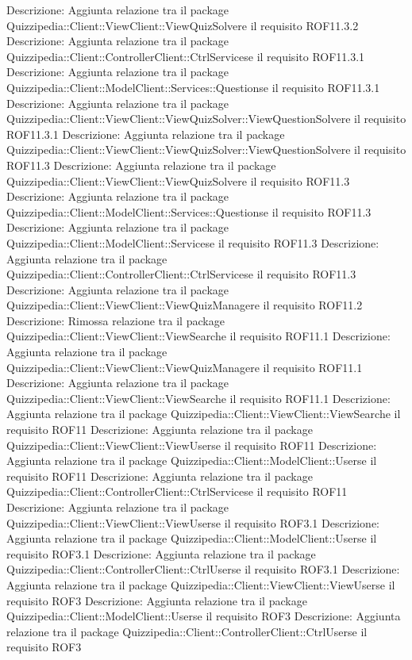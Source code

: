 Descrizione: Aggiunta relazione tra il package Quizzipedia::Client::ViewClient::ViewQuizSolvere il requisito ROF11.3.2 
Descrizione: Aggiunta relazione tra il package Quizzipedia::Client::ControllerClient::CtrlServicese il requisito ROF11.3.1 
Descrizione: Aggiunta relazione tra il package Quizzipedia::Client::ModelClient::Services::Questionse il requisito ROF11.3.1 
Descrizione: Aggiunta relazione tra il package Quizzipedia::Client::ViewClient::ViewQuizSolver::ViewQuestionSolvere il requisito ROF11.3.1 
Descrizione: Aggiunta relazione tra il package Quizzipedia::Client::ViewClient::ViewQuizSolver::ViewQuestionSolvere il requisito ROF11.3 
Descrizione: Aggiunta relazione tra il package Quizzipedia::Client::ViewClient::ViewQuizSolvere il requisito ROF11.3 
Descrizione: Aggiunta relazione tra il package Quizzipedia::Client::ModelClient::Services::Questionse il requisito ROF11.3 
Descrizione: Aggiunta relazione tra il package Quizzipedia::Client::ModelClient::Servicese il requisito ROF11.3 
Descrizione: Aggiunta relazione tra il package Quizzipedia::Client::ControllerClient::CtrlServicese il requisito ROF11.3 
Descrizione: Aggiunta relazione tra il package Quizzipedia::Client::ViewClient::ViewQuizManagere il requisito ROF11.2 
Descrizione: Rimossa relazione tra il package Quizzipedia::Client::ViewClient::ViewSearche il requisito ROF11.1 
Descrizione: Aggiunta relazione tra il package Quizzipedia::Client::ViewClient::ViewQuizManagere il requisito ROF11.1 
Descrizione: Aggiunta relazione tra il package Quizzipedia::Client::ViewClient::ViewSearche il requisito ROF11.1 
Descrizione: Aggiunta relazione tra il package Quizzipedia::Client::ViewClient::ViewSearche il requisito ROF11 
Descrizione: Aggiunta relazione tra il package Quizzipedia::Client::ViewClient::ViewUserse il requisito ROF11 
Descrizione: Aggiunta relazione tra il package Quizzipedia::Client::ModelClient::Userse il requisito ROF11 
Descrizione: Aggiunta relazione tra il package Quizzipedia::Client::ControllerClient::CtrlServicese il requisito ROF11 
Descrizione: Aggiunta relazione tra il package Quizzipedia::Client::ViewClient::ViewUserse il requisito ROF3.1 
Descrizione: Aggiunta relazione tra il package Quizzipedia::Client::ModelClient::Userse il requisito ROF3.1 
Descrizione: Aggiunta relazione tra il package Quizzipedia::Client::ControllerClient::CtrlUserse il requisito ROF3.1 
Descrizione: Aggiunta relazione tra il package Quizzipedia::Client::ViewClient::ViewUserse il requisito ROF3 
Descrizione: Aggiunta relazione tra il package Quizzipedia::Client::ModelClient::Userse il requisito ROF3 
Descrizione: Aggiunta relazione tra il package Quizzipedia::Client::ControllerClient::CtrlUserse il requisito ROF3 
